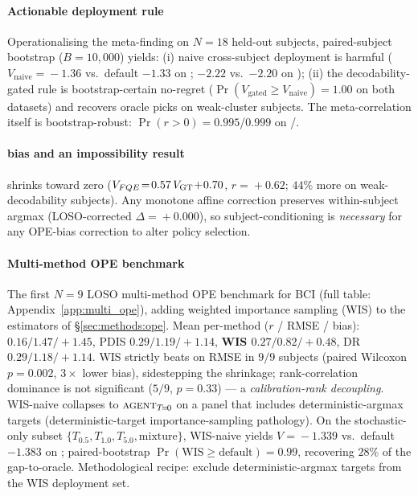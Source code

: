\paragraph*{Actionable deployment rule}
Operationalising the meta-finding on $N\!=\!18$ held-out subjects,
paired-subject bootstrap ($B\!=\!10{,}000$) yields: (i) naive
cross-subject \fqe{} deployment is harmful
($V_{\text{naive}}\!=\!-1.36$ vs.\ default $-1.33$ on \bcib{};
$-2.22$ vs.\ $-2.20$ on \bcia{}); (ii) the decodability-gated rule
is bootstrap-certain no-regret
($\Pr(V_{\text{gated}}\!\ge\!V_{\text{naive}})\!=\!1.00$ on both
datasets) and recovers oracle picks on \bcia{} weak-cluster
subjects. The meta-correlation itself is bootstrap-robust:
$\Pr(r\!>\!0)\!=\!0.995$/$0.999$ on \bcib{}/\bcia{}.

\paragraph*{\fqe{} bias and an impossibility result}
\fqe{} shrinks toward zero
($V_{FQE}\!=\!0.57\,V_{\text{GT}}\!+\!0.70$, $r\!=\!+0.62$;
$44\%$ more on weak-decodability subjects). Any monotone affine
correction preserves within-subject argmax (LOSO-corrected
$\Delta\!=\!+0.000$), so subject-conditioning is \emph{necessary}
for any OPE-bias correction to alter policy selection.

\paragraph*{Multi-method OPE benchmark}
The first $N\!=\!9$ LOSO multi-method OPE benchmark for BCI
(full table: Appendix~\ref{app:multi_ope}), adding weighted
importance sampling (WIS) to the estimators of
\S\ref{sec:methods:ope}. Mean
per-method ($r$ / RMSE / bias):
\fqe{} $0.16/1.47/{+}1.45$, PDIS $0.29/1.19/{+}1.14$,
\textbf{WIS $\mathbf{0.27/0.82/{+}0.48}$},
DR $0.29/1.18/{+}1.14$.
WIS strictly beats \fqe{} on RMSE in $9/9$ subjects (paired
Wilcoxon $p\!=\!0.002$, $3\times$ lower bias), sidestepping the
shrinkage; rank-correlation dominance is not significant
($5/9$, $p\!=\!0.33$) --- a \emph{calibration-rank decoupling}.
WIS-naive collapses to $\textsc{agent}_{T\!=\!0}$ on a panel that
includes deterministic-argmax targets (deterministic-target
importance-sampling pathology). On the stochastic-only subset
$\{T_{0.5}, T_{1.0}, T_{5.0}, \text{mixture}\}$, WIS-naive
yields $V\!=\!-1.339$ vs.\ default $-1.383$ on \bcib{};
paired-bootstrap $\Pr(\text{WIS}\!\ge\!\text{default})\!=\!0.99$,
recovering $28\%$ of the gap-to-oracle. Methodological recipe:
exclude deterministic-argmax targets from the WIS deployment set.

